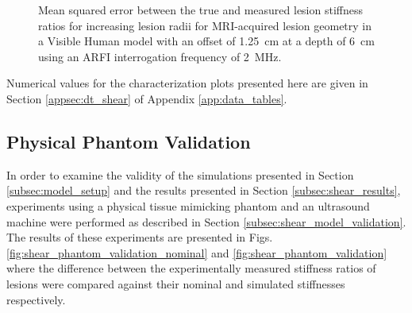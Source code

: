 			\begin{figure}[!htb]
				\centering
				\caption[Shear-wave speed quantified mean squared error related to MRI-acquired lesion size in a Visible Human model]{Mean squared error between the true and measured lesion stiffness ratios for increasing lesion radii for MRI-acquired lesion geometry in a Visible Human model with an offset of \SI{1.25}{\cm} at a depth of \SI{6}{\cm} using an ARFI interrogation frequency of \SI{2}{\MHz}.}
				\label{fig:erel_human_radius_mse}
			\end{figure}

			Numerical values for the characterization plots presented here are given in Section \ref{appsec:dt_shear} of Appendix \ref{app:data_tables}.

		\FloatBarrier
		\subsection{Physical Phantom Validation}
			In order to examine the validity of the simulations presented in Section \ref{subsec:model_setup} and the results presented in Section \ref{subsec:shear_results}, experiments using a physical tissue mimicking phantom and an ultrasound machine were performed as described in Section \ref{subsec:shear_model_validation}. The results of these experiments are presented in Figs. \ref{fig:shear_phantom_validation_nominal} and \ref{fig:shear_phantom_validation} where the difference between the experimentally measured stiffness ratios of lesions were compared against their nominal and simulated stiffnesses respectively.

